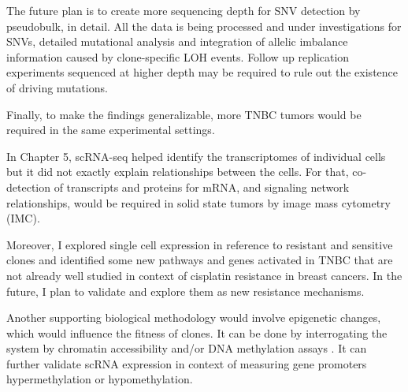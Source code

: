 The future plan is to create more sequencing depth for SNV detection by pseudobulk, in detail. All the data is being processed and under investigations for SNVs, detailed mutational analysis and integration of allelic imbalance information caused by clone-specific \ac{LOH} events. Follow up replication experiments sequenced at higher depth may be required to rule out the existence of driving mutations. 

Finally, to make the findings generalizable, more TNBC tumors would be required in the same experimental settings.


In Chapter 5, scRNA-seq helped identify the transcriptomes of individual cells but it did not exactly explain relationships between the cells. For that,  co-detection of transcripts and proteins for mRNA, and signaling network relationships, would be required in solid state tumors by image mass cytometry (IMC).



Moreover, I explored single cell expression in reference to resistant and sensitive clones and identified some new pathways and genes activated in TNBC that are not already well studied in context of cisplatin resistance in breast cancers. In the future, I plan to validate and explore them as new resistance mechanisms.



Another supporting biological methodology would involve epigenetic changes, which would influence the fitness of clones. It can be done by interrogating the system by chromatin accessibility and/or DNA methylation assays . It can further validate scRNA expression in context of measuring gene promoters hypermethylation or hypomethylation.









